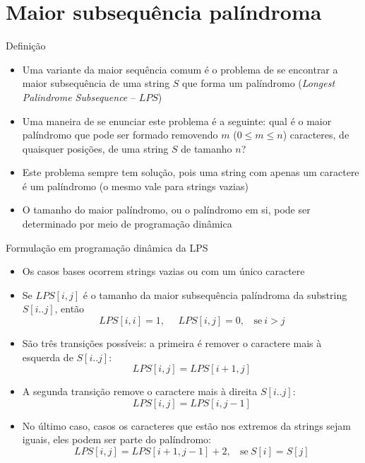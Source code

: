 \section{Maior subsequência palíndroma}

\begin{frame}[fragile]{Definição}

    \begin{itemize}
        \item Uma variante da maior sequência comum é o problema de se encontrar a maior 
            subsequência de uma string $S$ que forma um palíndromo (\textit{Longest Palindrome 
            Subsequence} -- $LPS$)
        \pause

        \item Uma maneira de se enunciar este problema é a seguinte: qual é o maior palíndromo que 
            pode ser formado removendo $m$ ($0 \leq m \leq n$) caracteres, de quaisquer posições, 
            de uma string $S$ de tamanho $n$?
        \pause

        \item Este problema sempre tem solução, pois uma string com apenas um caractere é um 
            palíndromo (o mesmo vale para strings vazias)
        \pause

        \item O tamanho do maior palíndromo, ou o palíndromo em si, pode ser determinado por
            meio de programação dinâmica
    \end{itemize}
\end{frame}

\begin{frame}[fragile]{Formulação em programação dinâmica da LPS}

    \begin{itemize}
        \item Os casos bases ocorrem strings vazias ou com um único caractere 
        \pause

        \item Se $LPS[i,j]$ é o tamanho da maior subsequência palíndroma da substring 
            $S[i..j]$, então
            \[
                LPS[i,i] = 1, \ \ \ \ \ \ LPS[i,j] = 0, \ \ \ \ \mbox{se}\ i > j
            \]
        \pause

        \item São três transições possíveis:
        a primeira é remover o caractere mais à esquerda de $S[i..j]$:
        \[
             LPS[i,j] = LPS[i+1,j]
        \]
        \pause

        \item A segunda transição remove o caractere mais à direita $S[i..j]$:
        \[
            LPS[i, j] = LPS[i, j - 1]
        \] 
        \pause

        \item No último caso, casos os caracteres que estão nos extremos da strings sejam iguais, 
            eles podem ser parte do palíndromo: 
        \[
            LPS[i,j] = LPS[i+1,j-1] + 2,\ \ \ \ \mbox{se}\ S[i] = S[j]
        \]

    \end{itemize}

\end{frame}

